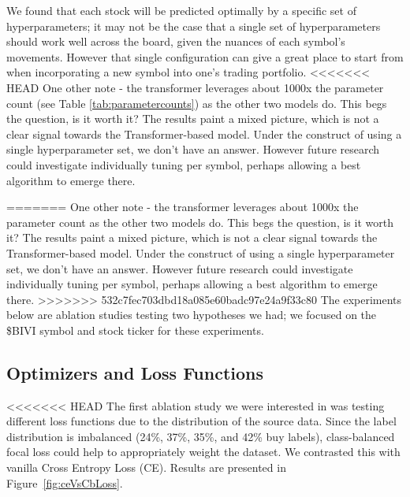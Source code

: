 \documentclass[10pt,twocolumn,letterpaper]{article}
\begin{document}
We found that each stock will be predicted optimally by a specific set of hyperparameters; it may not be the case that a single set of hyperparameters should work well across the board, given the nuances of each symbol’s movements. However that single configuration can give a great place to start from when incorporating a new symbol into one’s trading portfolio.
<<<<<<< HEAD
One other note - the transformer leverages about 1000x the parameter count (see Table \ref{tab:parametercounts}) as the other two models do. This begs the question, is it worth it? The results paint a mixed picture, which is not a clear signal towards the Transformer-based model. Under the construct of using a single hyperparameter set, we don’t have an answer. However future research could investigate individually tuning per symbol, perhaps allowing a best algorithm to emerge there.

=======
One other note - the transformer leverages about 1000x the parameter count as the other two models do. This begs the question, is it worth it? The results paint a mixed picture, which is not a clear signal towards the Transformer-based model. Under the construct of using a single hyperparameter set, we don’t have an answer. However future research could investigate individually tuning per symbol, perhaps allowing a best algorithm to emerge there.
>>>>>>> 532c7fec703dbd18a085e60badc97e24a9f33c80
The experiments below are ablation studies testing two hypotheses we had; we focused on the \$BIVI symbol and stock ticker for these experiments.

\subsection{Optimizers and Loss Functions}

<<<<<<< HEAD
The first ablation study we were interested in was testing different loss functions due to the distribution of the source data. Since the label distribution is imbalanced (24\%, 37\%, 35\%, and 42\% buy labels), class-balanced focal loss could help to appropriately weight the dataset\cite{cb_focal}. We contrasted this with vanilla Cross Entropy Loss (CE). Results are presented in Figure~\ref{fig:ceVsCbLoss}.
\end{document}
